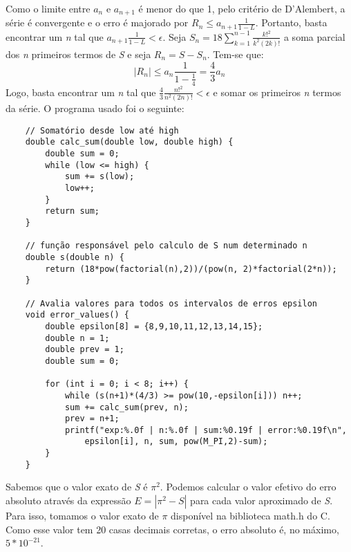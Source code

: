 \documentclass[12pt, letterpaper]{article}
\begin{document}
Como o limite entre $a_n$ e $a_{n+1}$ é menor do que 1, pelo critério de D'Alembert, a série é convergente e o erro é majorado por $R_n \leq a_{n+1} \frac{1}{1-L}$. Portanto, basta encontrar um \textit{n} tal que $a_{n+1} \frac{1}{1-L} < \epsilon$.
\newline
Seja $S_n=18\sum_{k=1}^{n-1} \frac{k!^2}{k^2(2k)!}$ a soma parcial dos \textit{n} primeiros termos de \textit{S} e seja $R_n = S - S_n$. Tem-se que:
$$|R_n| \leq a_n \frac{1}{1-\frac{1}{4}} = \frac{4}{3} a_n$$
\newline
Logo, basta encontrar um \textit{n} tal que $\frac{4}{3} \frac{n!^2}{n^2(2n)!} < \epsilon$ e somar os primeiros \textit{n} termos da série. O programa usado foi o seguinte:
\begin{verbatim}
    // Somatório desde low até high
    double calc_sum(double low, double high) {
        double sum = 0;
        while (low <= high) {
            sum += s(low);
            low++;
        }
        return sum;
    }

    // função responsável pelo calculo de S num determinado n
    double s(double n) {
        return (18*pow(factorial(n),2))/(pow(n, 2)*factorial(2*n));
    }

    // Avalia valores para todos os intervalos de erros epsilon
    void error_values() {
        double epsilon[8] = {8,9,10,11,12,13,14,15};
        double n = 1;
        double prev = 1;
        double sum = 0;
    
        for (int i = 0; i < 8; i++) {
            while (s(n+1)*(4/3) >= pow(10,-epsilon[i])) n++;
            sum += calc_sum(prev, n);
            prev = n+1;
            printf("exp:%.0f | n:%.0f | sum:%0.19f | error:%0.19f\n", 
                epsilon[i], n, sum, pow(M_PI,2)-sum);
        }
    }
\end{verbatim}

Sabemos que o valor exato de \textit{S} é $\pi^2$. Podemos calcular o valor efetivo do erro absoluto através da expressão $E = |\pi^2 - S|$ para cada valor aproximado de \textit{S}. Para isso, tomamos o valor exato de $\pi$ disponível na biblioteca math.h do C. Como esse valor tem 20 casas decimais corretas, o erro absoluto é, no máximo, $5*10^{-21}$.
\end{document}
